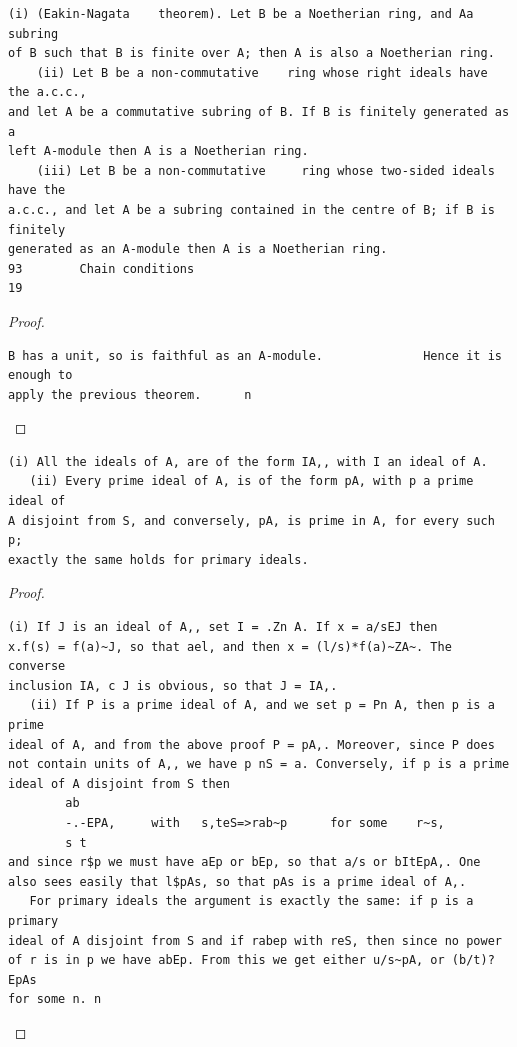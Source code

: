\begin{theorem}\label{mcrt-auto-theorem-3-7}\uses{}
\begin{verbatim}
(i) (Eakin-Nagata    theorem). Let B be a Noetherian ring, and Aa subring
of B such that B is finite over A; then A is also a Noetherian ring.
    (ii) Let B be a non-commutative    ring whose right ideals have the a.c.c.,
and let A be a commutative subring of B. If B is finitely generated as a
left A-module then A is a Noetherian ring.
    (iii) Let B be a non-commutative     ring whose two-sided ideals have the
a.c.c., and let A be a subring contained in the centre of B; if B is finitely
generated as an A-module then A is a Noetherian ring.
93        Chain conditions                                                          19
\end{verbatim}
\end{theorem}
\begin{proof}
\begin{verbatim}
B has a unit, so is faithful as an A-module.              Hence it is enough to
apply the previous theorem.      n
\end{verbatim}
\end{proof}


\begin{theorem}\label{mcrt-auto-theorem-4-1}\uses{}
\begin{verbatim}
(i) All the ideals of A, are of the form IA,, with I an ideal of A.
   (ii) Every prime ideal of A, is of the form pA, with p a prime ideal of
A disjoint from S, and conversely, pA, is prime in A, for every such p;
exactly the same holds for primary ideals.
\end{verbatim}
\end{theorem}
\begin{proof}
\begin{verbatim}
(i) If J is an ideal of A,, set I = .Zn A. If x = a/sEJ then
x.f(s) = f(a)~J, so that ael, and then x = (l/s)*f(a)~ZA~. The converse
inclusion IA, c J is obvious, so that J = IA,.
   (ii) If P is a prime ideal of A, and we set p = Pn A, then p is a prime
ideal of A, and from the above proof P = pA,. Moreover, since P does
not contain units of A,, we have p nS = a. Conversely, if p is a prime
ideal of A disjoint from S then
        ab
        -.-EPA,     with   s,teS=>rab~p      for some    r~s,
        s t
and since r$p we must have aEp or bEp, so that a/s or bItEpA,. One
also sees easily that l$pAs, so that pAs is a prime ideal of A,.
   For primary ideals the argument is exactly the same: if p is a primary
ideal of A disjoint from S and if rabep with reS, then since no power
of r is in p we have abEp. From this we get either u/s~pA, or (b/t)?EpAs
for some n. n
\end{verbatim}
\end{proof}


